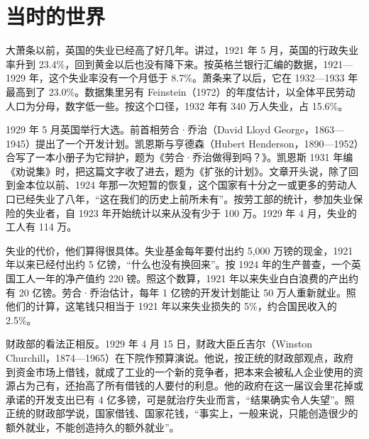 \section{当时的世界}\label{sec:generaltheory-world}

大萧条以前，英国的失业已经高了好几年。讲过，1921 年 5 月，英国的行政失业率升到 23.4\%，回到黄金以后也没有降下来。按英格兰银行汇编的数据，1921—1929 年，这个失业率没有一个月低于 8.7\%\cite{boe2017}。萧条来了以后，它在 1932—1933 年最高到了 23.0\%\cite{boe2017}。数据集里另有 Feinstein（1972）的年度估计，以全体平民劳动人口为分母，数字低一些。按这个口径，1932 年有 340 万人失业，占 15.6\%\cite{boe2017}。


1929 年 5 月英国举行大选。前首相劳合·乔治（David Lloyd George，1863—1945）提出了一个开发计划\cite{keynes1929c,hansardpeople32}。凯恩斯与亨德森（Hubert Henderson，1890—1952）合写了一本小册子为它辩护，题为《劳合·乔治做得到吗？》\cite{keynes1929c,loc32}。凯恩斯 1931 年编《劝说集》时，把这篇文字收了进去，题为《扩张的计划》\cite{keynes1929c}。文章开头说，除了回到金本位以前、1924 年那一次短暂的恢复，这个国家有十分之一或更多的劳动人口已经失业了八年，“这在我们的历史上前所未有”\cite{keynes1929c}。按劳工部的统计，参加失业保险的失业者，自 1923 年开始统计以来从没有少于 100 万。1929 年 4 月，失业的工人有 114 万\cite{keynes1929c}。

失业的代价，他们算得很具体。失业基金每年要付出约 5,000 万镑的现金，1921 年以来已经付出约 5 亿镑，“什么也没有换回来”\cite{keynes1929c}。按 1924 年的生产普查，一个英国工人一年的净产值约 220 镑\cite{keynes1929c}。照这个数算，1921 年以来失业白白浪费的产出约有 20 亿镑\cite{keynes1929c}。劳合·乔治估计，每年 1 亿镑的开发计划能让 50 万人重新就业\cite{keynes1929c}。照他们的计算，这笔钱只相当于 1921 年以来失业损失的 5\%，约合国民收入的 2.5\%\cite{keynes1929c}。

财政部的看法正相反。1929 年 4 月 15 日，财政大臣丘吉尔（Winston Churchill，1874—1965）在下院作预算演说\cite{hansard1929,hansardpeople32}。他说，按正统的财政部观点，政府到资金市场上借钱，就成了工业的一个新的竞争者，把本来会被私人企业使用的资源占为己有，还抬高了所有借钱的人要付的利息\cite{hansard1929}。他的政府在这一届议会里花掉或承诺的开发支出已有 4 亿多镑，可是就治疗失业而言，“结果确实令人失望”\cite{hansard1929}。照正统的财政部学说，国家借钱、国家花钱，“事实上，一般来说，只能创造很少的额外就业，不能创造持久的额外就业”\cite{hansard1929}。


